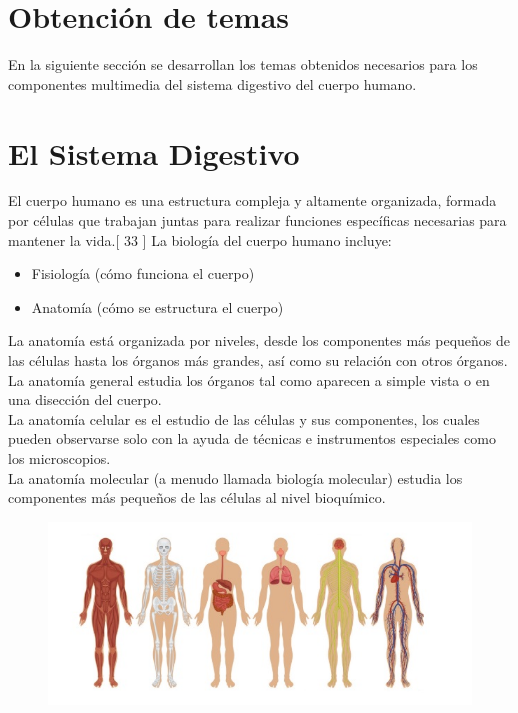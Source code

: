 \section{Obtención de temas}
En la siguiente sección se desarrollan los temas obtenidos necesarios para los componentes multimedia del sistema digestivo del cuerpo humano.\\

\section{El Sistema Digestivo}
El cuerpo humano es una estructura compleja y altamente organizada, formada por células que trabajan juntas para realizar funciones específicas necesarias 
para mantener la vida.[ 33 ] La biología del cuerpo humano incluye:
\begin{itemize}
	\item Fisiología (cómo funciona el cuerpo)
	\item Anatomía (cómo se estructura el cuerpo)	
\end{itemize}
La anatomía está organizada por niveles, desde los componentes más pequeños de las células hasta los órganos más grandes, así como su relación con otros órganos.\\
La anatomía general estudia los órganos tal como aparecen a simple vista o en una disección del cuerpo.\\
La anatomía celular es el estudio de las células y sus componentes, los cuales pueden observarse solo con la ayuda de técnicas e instrumentos especiales como los microscopios.\\
La anatomía molecular (a menudo llamada biología molecular) estudia los componentes más pequeños de las células al nivel bioquímico.\\
\begin{figure}[H]
	\begin{center}
 		\includegraphics[width = .7\textwidth]{source/images/image22.png}
	\end{center} 
\end{figure}
